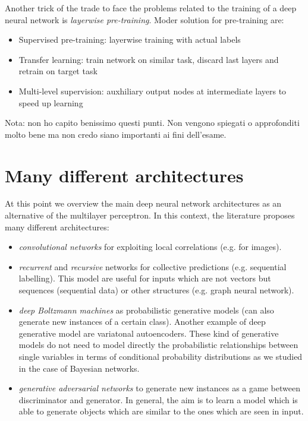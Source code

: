 Another trick of the trade to face the problems related to the training of a deep neural network is \textit{layerwise pre-training}. Moder solution for pre-training are:
\begin{itemize}
    \item Supervised pre-training: layerwise training with actual labels
    
    \item Transfer learning: train network on similar task, discard last layers and retrain on target task
    
    \item Multi-level supervision: auxhiliary output nodes at intermediate layers to speed up learning
\end{itemize}
Nota: non ho capito benissimo questi punti. Non vengono spiegati o approfonditi molto bene ma non credo siano importanti ai fini dell'esame.

\section{Many different architectures}
At this point we overview the main deep neural network architectures as an alternative of the multilayer perceptron. In this context, the literature proposes many different architectures:

\begin{itemize}
    \item \textit{convolutional networks} for exploiting local correlations (e.g. for images).
    
    \item \textit{recurrent} and \textit{recursive} networks for collective predictions (e.g. sequential labelling). This model are useful for inputs which are not vectors but sequences (sequential data) or other structures (e.g. graph neural network).
    
    \item \textit{deep Boltzmann machines} as probabilistic generative models (can also generate new instances of a certain class). Another example of deep generative model are variatonal autoencoders. These kind of generative models do not need to model directly the probabilistic relationships between single variables in terms of conditional probability distributions as we studied in the case of Bayesian networks.
    
    \item \textit{generative adversarial networks} to generate new instances as a game between discriminator and generator. In general, the aim is to learn a model which is able to generate objects which are similar to the ones which are seen in input.
\end{itemize}

